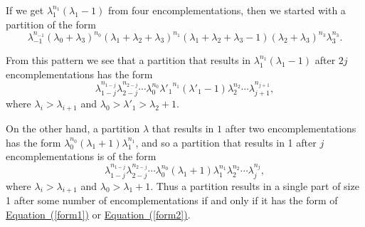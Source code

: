 \documentclass{book}
\begin{document}
\begin{activity}[]
If we get \(\lambda_1^{n_1}(\lambda_1-1)\) from four encomplementations, then we started with a partition of the form%
\begin{equation*}
\lambda_{-1}^{n_{-1}}(\lambda_0+\lambda_{3})^{n_0}(\lambda_1+
\lambda_2 +
\lambda_{3})^{n_1}(\lambda_1+\lambda_2 +\lambda_3-1)(\lambda_2+
\lambda_{3})^{n_3}
\lambda_3^{n_3}.
\end{equation*}
%
\par
\hypertarget{p-1588}{}%
From this pattern we see that a partition that results in \(\lambda_1^{n_1}(\lambda_1-1)\) after \(2j\) encomplementations has the form%
\begin{equation}
\lambda_{1-j}^{n_{1-j}}\lambda_{2-j}^{n_{2-j}}\cdots
\lambda_0^{n_0}
{\lambda'_1}^{n_1}
(\lambda'_1-1)\lambda_2^{n_2}\cdots
\lambda_{j+1}^{n_{j+1}},\label{form1}
\end{equation}
where \(\lambda_i>\lambda_{i+1}\) and \(\lambda_0>\lambda'_1>\lambda_2+1\).%
\par
\hypertarget{p-1589}{}%
On the other hand, a partition \(\lambda\) that results in \(1\) after two encomplementations has the form \(\lambda_0^{n_0}(\lambda_1+1)\lambda_1^{n_1}\), and so a partition that results in 1 after \(j\) encomplementations is of the form%
\begin{equation}
\lambda_{1-j}^{n_{1-j}}\lambda_{2-j}^{n_{2-j}}\cdots
\lambda_0^{n_0}(\lambda_1+1)\lambda_1^{n_1}\lambda_2^{n_2}\cdots
\lambda_j^{n_j},\label{form2}
\end{equation}
where \(\lambda_i>\lambda_{i+1}\) and \(\lambda_0>\lambda_1+1\). Thus a partition results in a single part of size 1 after some number of encomplementations if and only if it has the form of \hyperref[form1]{Equation~(\ref{form1})} or \hyperref[form2]{Equation~(\ref{form2})}.%
\end{activity}
\end{document}
